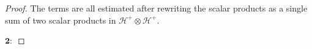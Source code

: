 \documentclass[b5paper,draft,openbib,12pt]{memoir}
\begin{document}
\begin{proof}

The terms 
are all estimated after rewriting the scalar products as a 
single sum of two scalar products in \(\mathcal{H}^+\otimes \mathcal{H}^+\).

\(\boldsymbol{2:}\) 


\end{proof}
\end{document}
